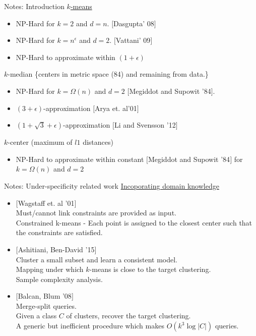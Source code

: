 \documentclass{beamer}
\begin{document}


\begin{frame}[label=notesIntroduction]{Notes: Introduction}
\hyperlink{clusteringChallenges}{$k$-means}
\begin{itemize}
  \item NP-Hard for $k = 2$ and $d = n$. $[$Dasgupta' 08$]$
  \item NP-Hard for $k = n^{\epsilon}$ and $d = 2$. $[$Vattani' 09$]$
  \item NP-Hard to approximate within $(1+\epsilon)$
\end{itemize}
$k$-median \{centers in metric space (84) and remaining from data.\}
\begin{itemize}
	\item NP-Hard for $k=\Omega(n)$ and $d=2$ $[$Megiddot and Supowit '84$]$.
	\item $(3+\epsilon)$-approximation $[$Arya et. al'01$]$
	\item $(1+\sqrt3 + \epsilon)$-approximation $[$Li and Svensson '12$]$
\end{itemize}
$k$-center (maximum of $l1$ distances)
\begin{itemize}
	\item NP-Hard to approximate within constant $[$Megiddot and Supowit '84$]$ for $k=\Omega(n)$ and $d=2$
\end{itemize}
\end{frame}

\begin{frame}[label=notesUnderspecificityRelated]{Notes: Under-specificity related work}
\hyperlink{underspecificityRelated}{Incoporating domain knowledge}
\begin{itemize}
  \item $[$Wagstaff et. al '01$]$\\
  Must/cannot link constraints are provided as input.\\ 
  Constrained k-means - Each point is assigned to the closest center such that the constraints are satisfied. 
  \item $[$Ashitiani, Ben-David '15$]$\\
  Cluster a small subset and learn a consistent model.\\
  Mapping under which $k$-means is close to the target clustering.\\
  Sample complexity analysis.
  \item $[$Balcan, Blum '08$]$\\
  Merge-split queries.\\
  Given a class $C$ of clusters, recover the target clustering.\\
  A generic but inefficient procedure which makes $O(k^3 \log |C|)$ queries.
  \end{itemize}
\end{frame}
\end{document}
